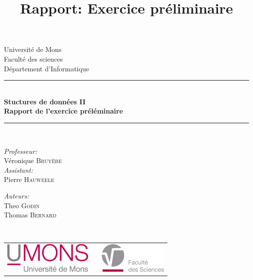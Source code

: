 \documentclass{article}
\title{Rapport: Exercice préliminaire}
\author{ }
\date{ }
\begin{document}
\begin{titlepage}
    \begin{center}
        
        {\Large Université de Mons}\\[1ex]
        {\Large Faculté des sciences}\\[1ex]
        {\Large Département d'Informatique}\\[2.5cm]
        
        \newcommand{\HRule}{\rule{\linewidth}{0.3mm}}
        \HRule \\[0.3cm]
        { \LARGE \bfseries Stuctures de données II \\[0.3cm]}
        { \LARGE \bfseries Rapport de l'exercice préléminaire \\[0.1cm]} %
        \HRule \\[1.5cm]
        
        \begin{minipage}[t]{0.45\textwidth}
            \begin{flushleft} \large
                \emph{Professeur:}\\
                Véronique \textsc{Bruyère}\\
                \emph{Assistant:}\\
                Pierre \textsc{Hauweele}\\
            \end{flushleft}
        \end{minipage}
        \begin{minipage}[t]{0.45\textwidth}
            \begin{flushright} \large
                \emph{Auteurs:} \\
                Theo \textsc{Godin} \\
                Thomas \textsc{Bernard} 
            \end{flushright}
        \end{minipage}\\[2ex]
        
        \vfill
        
        \begin{center}
            \begin{tabular}[t]{c c c}
                \includegraphics[height=1.5cm]{images/logoumons.jpg} &
                \hspace{0.3cm} &
                \includegraphics[height=1.5cm]{images/logofs.jpg}
            \end{tabular}
        \end{center}~\\
        

\end{center}
\end{titlepage}
\end{document}
